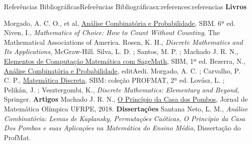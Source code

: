\documentclass[oneside,10pt,]{book}
\newcommand{\terminology}[1]{\textbf{#1}}
\numberwithin{equation}{section}
\begin{document}
\begin{references-}{Referências Bibliográficas}{}{Referências Bibliográficas}{}{}{x:references:referencias}
\terminology{Livros}%
\begin{referencelist}
\hypertarget{x:biblio:morgado}{}  Morgado, A. C. O., et al, \href{https://loja.sbm.org.br/index.php/analise-combinatoria-e-probabilidade.html}{Análise Combinatória e Probabilidade}, SBM. 6ª ed.
\hypertarget{g:biblio:idp320}{}  Niven, I., \textit{Mathematics of Choice: How to Count Without Counting}, The Mathematical Associations of America.
\hypertarget{g:biblio:idp321}{}  Rosen, K. H., \textit{Discrete Mathematics and Its Applications}, McGraw-Hill.
\hypertarget{g:biblio:idp322}{}  Silva, L. D. ; Santos, M. P. ; Machado J. R. N., \href{https://loja.sbm.org.br/index.php/elementos-de-computac-o-matematica-com-sagemath.html}{Elementos de Computação Matemática com SageMath}, SBM, 1ª ed.
\hypertarget{g:biblio:idp323}{}  Bezerra, N., \href{https://livroaberto.ufpa.br/jspui/bitstream/prefix/480/1/Livro_AnaliseCombinatoriaProbabilidade.pdf}{Análise Combinatória e Probabilidade}, editAedi.
\hypertarget{g:biblio:idp324}{}  Morgado, A. C. ; Carvalho, P. C. P., \href{https://loja.sbm.org.br/index.php/colecoes/sbm/colecao-profmat/matematica-discreta.html}{Matemática Discreta}, SBM: coleção PROFMAT, 2ª ed.
\hypertarget{g:biblio:idp325}{}  Lovász, L. ; Pelikán, J. ; Vesztergombi, K., \textit{Discrete Mathematics: Elementary and Beyond}, Springer.
\terminology{Artigos}%
\hypertarget{x:biblio:oxente01}{}  Machado J. R. N., \href{http://ematematicaoxente.com.br/wp-content/uploads/2018/12/jornal_9ed.pdf}{O Princípio da Casa dos Pombos}, Jornal de Matemática Olímpica UFRPE, 2018.
\terminology{Dissertações}%
\hypertarget{x:biblio:luiz}{}  Santana Neto, L. M., \textit{Análise Combinatória: Lemas de Kaplansky, Permutações Caóticas, O Princípio da Casa Dos Pombos e suas Aplicações na Matemática do Ensino Médio}, Dissertação do ProfMat.
\end{referencelist}
\end{references-}
\end{document}
